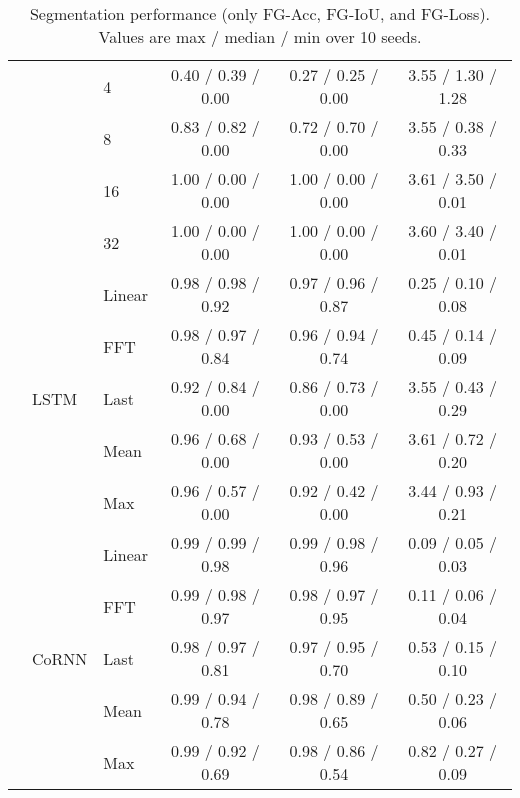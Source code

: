 \begin{table*}[ht!]
\begin{minipage}{0.99\linewidth}
\begin{tabular}{lllccc}
 &  & 4 
 & 0.40 / 0.39 / 0.00 
 & 0.27 / 0.25 / 0.00 
 & 3.55 / 1.30 / 1.28 
\\
 &  & 8 
 & 0.83 / 0.82 / 0.00 
 & 0.72 / 0.70 / 0.00 
 & 3.55 / 0.38 / 0.33 
\\
 &  & 16 
 & 1.00 / 0.00 / 0.00 
 & 1.00 / 0.00 / 0.00 
 & 3.61 / 3.50 / 0.01 
\\
 &  & 32 
 & 1.00 / 0.00 / 0.00 
 & 1.00 / 0.00 / 0.00 
 & 3.60 / 3.40 / 0.01 
\\
\cline{2-6}
 & \multirow{5}{*}{LSTM} 
 & Linear 
 & 0.98 / 0.98 / 0.92 
 & 0.97 / 0.96 / 0.87 
 & 0.25 / 0.10 / 0.08 
\\
 &  & FFT 
 & 0.98 / 0.97 / 0.84 
 & 0.96 / 0.94 / 0.74 
 & 0.45 / 0.14 / 0.09 
\\
 &  & Last 
 & 0.92 / 0.84 / 0.00 
 & 0.86 / 0.73 / 0.00 
 & 3.55 / 0.43 / 0.29 
\\
 &  & Mean 
 & 0.96 / 0.68 / 0.00 
 & 0.93 / 0.53 / 0.00 
 & 3.61 / 0.72 / 0.20 
\\
 &  & Max 
 & 0.96 / 0.57 / 0.00 
 & 0.92 / 0.42 / 0.00 
 & 3.44 / 0.93 / 0.21 
\\
\cline{2-6}
 & \multirow{5}{*}{CoRNN} 
 & Linear 
 & 0.99 / 0.99 / 0.98 
 & 0.99 / 0.98 / 0.96 
 & 0.09 / 0.05 / 0.03 
\\
 &  & FFT 
 & 0.99 / 0.98 / 0.97 
 & 0.98 / 0.97 / 0.95 
 & 0.11 / 0.06 / 0.04 
\\
 &  & Last 
 & 0.98 / 0.97 / 0.81 
 & 0.97 / 0.95 / 0.70 
 & 0.53 / 0.15 / 0.10 
\\
 &  & Mean 
 & 0.99 / 0.94 / 0.78 
 & 0.98 / 0.89 / 0.65 
 & 0.50 / 0.23 / 0.06 
\\
 &  & Max 
 & 0.99 / 0.92 / 0.69 
 & 0.98 / 0.86 / 0.54 
 & 0.82 / 0.27 / 0.09 
\\
\bottomrule
\end{tabular}
\caption{Segmentation performance (only FG-Acc, FG-IoU, and FG-Loss). 
Values are max / median / min over 10 seeds.}
\label{tab:fg_max_min}
\end{minipage}
\end{table*}